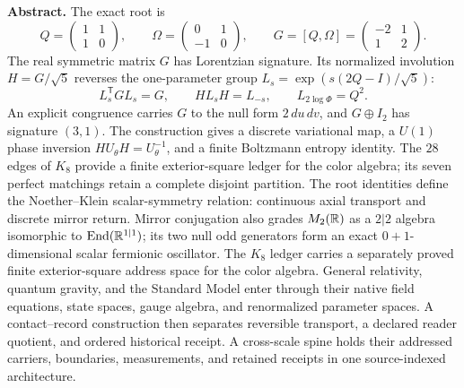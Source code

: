 \noindent\textbf{Abstract.} The exact root is
\[
Q=\begin{pmatrix}1&1\\1&0\end{pmatrix},\qquad
\Omega=\begin{pmatrix}0&1\\-1&0\end{pmatrix},\qquad
G=[Q,\Omega]=\begin{pmatrix}-2&1\\1&2\end{pmatrix}.
\]
The real symmetric matrix $G$ has Lorentzian signature.  Its normalized
involution $H=G/\sqrt5$ reverses the one-parameter group
$L_s=\exp(s(2Q-I)/\sqrt5)$:
\[
L_s^{\mathsf T}GL_s=G,\qquad HL_sH=L_{-s},\qquad
L_{2\log\Phi}=Q^2.
\]
An explicit congruence carries $G$ to the null form $2\,du\,dv$, and
$G\oplus I_2$ has signature $(3,1)$.  The construction gives a discrete
variational map, a $U(1)$ phase inversion
$HU_\theta H=U_\theta^{-1}$, and a finite Boltzmann entropy identity.  The
$28$ edges of $K_8$ provide a finite exterior-square ledger for the color
algebra; its seven perfect matchings retain a complete disjoint partition.
The root identities define the Noether--Klein scalar-symmetry relation:
continuous axial transport and discrete mirror return.  Mirror conjugation
also grades $M_2(\mathbb R)$ as a $2|2$ algebra isomorphic to
$\mathrm{End}(\mathbb R^{1|1})$; its two null odd generators form an exact
$0+1$-dimensional scalar fermionic oscillator.  The $K_8$ ledger carries a
separately proved finite exterior-square address space for the color algebra.
General relativity, quantum gravity, and the Standard Model enter through
their native field equations, state spaces, gauge algebra, and renormalized
parameter spaces.  A contact--record construction then separates reversible
transport, a declared reader quotient, and ordered historical receipt.  A
cross-scale spine holds their addressed carriers, boundaries, measurements,
and retained receipts in one source-indexed architecture.

